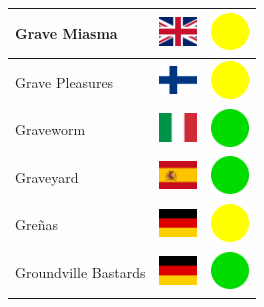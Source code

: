 \documentclass[12pt, a4paper, twoside]{report}
\begin{document}
\begin{center}
\begin{longtable}{|p{5cm}|p{2cm}|p{2cm}|}
 Grave Miasma                                               & \includegraphics[width=1cm]{../4x3/gb} &   \includegraphics[width=1cm]{../likes/m} \\ \hline
 Grave Pleasures                                            & \includegraphics[width=1cm]{../4x3/fi} &   \includegraphics[width=1cm]{../likes/m} \\ \hline
 Graveworm                                                  & \includegraphics[width=1cm]{../4x3/it} &   \includegraphics[width=1cm]{../likes/y} \\ \hline
 Graveyard                                                  & \includegraphics[width=1cm]{../4x3/es} &   \includegraphics[width=1cm]{../likes/y} \\ \hline
 Greñas                                                     & \includegraphics[width=1cm]{../4x3/de} &   \includegraphics[width=1cm]{../likes/m} \\ \hline
 Groundville Bastards                                       & \includegraphics[width=1cm]{../4x3/de} &   \includegraphics[width=1cm]{../likes/y} \\ \hline

\end{longtable}
\end{center}
\end{document}
